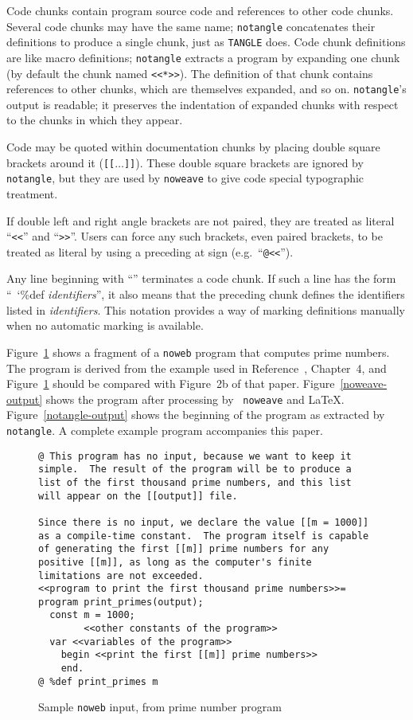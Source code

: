 Code chunks contain program source code and references to other code
chunks.  
Several code chunks may have the same name; {\tt notangle}
concatenates their definitions to produce a single chunk, just as
 {\tt TANGLE} does.
Code chunk definitions are like macro definitions;
{\tt notangle} extracts a program by expanding one chunk (by default
the chunk named \verb+<<*>>+).
The definition of that chunk contains references to other chunks,
which are themselves expanded, and so on.
{\tt notangle}'s output is readable; it preserves the indentation of expanded
chunks with respect to the chunks in which they appear.

Code may be quoted within documentation chunks by placing double
square brackets around it ({\tt [[}$\ldots${\tt]]}). 
These double square brackets are ignored by {\tt notangle}, but they
are used by {\tt noweave} to give code special typographic
treatment.

If double left and right angle brackets are not paired, they are
treated as literal ``{\tt<<}'' and ``{\tt>>}''.  Users can force any
such brackets, even paired brackets, to be treated as literal by
using a preceding at sign (e.g.~``{\tt @<<}'').

Any line beginning with ``{\tt@ }'' terminates a code chunk.
If such a line has the form
``{\tt@~\char`\%def {\rm\it identifiers}}'',
it also means that the preceding chunk defines the identifiers listed 
in {\it identifiers}.
This notation provides a way of marking definitions manually when 
no automatic marking is available.

Figure~\ref{sample-input} shows a fragment of a {\tt noweb} program
that computes prime numbers.
The program is derived from the example used in
Reference~, Chapter~4, and Figure~\ref{sample-input} should
be compared with Figure~2b of that paper.
Figure~\ref{noweave-output} shows the program after processing by {\tt
noweave} and {\LaTeX}.
Figure~\ref{notangle-output} shows the beginning of the program as
extracted by {\tt notangle}.
A complete example program accompanies this paper.

\begin{figure}
\begin{verbatim}
@ This program has no input, because we want to keep it
simple.  The result of the program will be to produce a
list of the first thousand prime numbers, and this list
will appear on the [[output]] file.

Since there is no input, we declare the value [[m = 1000]]
as a compile-time constant.  The program itself is capable
of generating the first [[m]] prime numbers for any
positive [[m]], as long as the computer's finite
limitations are not exceeded.
<<program to print the first thousand prime numbers>>=
program print_primes(output);
  const m = 1000;
        <<other constants of the program>>
  var <<variables of the program>>
    begin <<print the first [[m]] prime numbers>>
    end.
@ %def print_primes m
\end{verbatim} 
\caption{Sample {\tt noweb} input, from prime number program}
\label{sample-input}
\end{figure}



